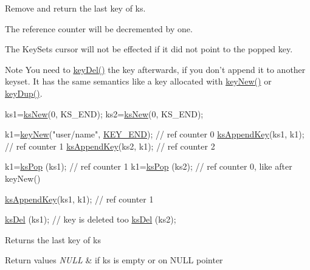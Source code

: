 Remove and return the last key of {\ttfamily ks}. 

The reference counter will be decremented by one.

The Key\+Sets cursor will not be effected if it did not point to the popped key.

\begin{DoxyNote}{Note}
You need to \hyperlink{group__key_ga3df95bbc2494e3e6703ece5639be5bb1}{key\+Del()} the key afterwards, if you don't append it to another keyset. It has the same semantics like a key allocated with \hyperlink{group__key_gad23c65b44bf48d773759e1f9a4d43b89}{key\+New()} or \hyperlink{group__key_gae6ec6a60cc4b8c1463fa08623d056ce3}{key\+Dup()}.
\end{DoxyNote}

\begin{DoxyCode}
ks1=\hyperlink{group__keyset_ga671e1aaee3ae9dc13b4834a4ddbd2c3c}{ksNew}(0, KS\_END);
ks2=\hyperlink{group__keyset_ga671e1aaee3ae9dc13b4834a4ddbd2c3c}{ksNew}(0, KS\_END);

k1=\hyperlink{group__key_gad23c65b44bf48d773759e1f9a4d43b89}{keyNew}(\textcolor{stringliteral}{"user/name"}, \hyperlink{group__key_gga91fb3178848bd682000958089abbaf40aa8adb6fcb92dec58fb19410eacfdd403}{KEY\_END}); \textcolor{comment}{// ref counter 0}
\hyperlink{group__keyset_gaa5a1d467a4d71041edce68ea7748ce45}{ksAppendKey}(ks1, k1); \textcolor{comment}{// ref counter 1}
\hyperlink{group__keyset_gaa5a1d467a4d71041edce68ea7748ce45}{ksAppendKey}(ks2, k1); \textcolor{comment}{// ref counter 2}

k1=\hyperlink{group__keyset_gae42530b04defb772059de0600159cf69}{ksPop} (ks1); \textcolor{comment}{// ref counter 1}
k1=\hyperlink{group__keyset_gae42530b04defb772059de0600159cf69}{ksPop} (ks2); \textcolor{comment}{// ref counter 0, like after keyNew()}

\hyperlink{group__keyset_gaa5a1d467a4d71041edce68ea7748ce45}{ksAppendKey}(ks1, k1); \textcolor{comment}{// ref counter 1}

\hyperlink{group__keyset_ga27e5c16473b02a422238c8d970db7ac8}{ksDel} (ks1); \textcolor{comment}{// key is deleted too}
\hyperlink{group__keyset_ga27e5c16473b02a422238c8d970db7ac8}{ksDel} (ks2);
\end{DoxyCode}


\begin{DoxyReturn}{Returns}
the last key of {\ttfamily ks} 
\end{DoxyReturn}

\begin{DoxyRetVals}{Return values}
{\em N\+U\+L\+L} & if {\ttfamily ks} is empty or on N\+U\+L\+L pointer \\
\hline
\end{DoxyRetVals}


